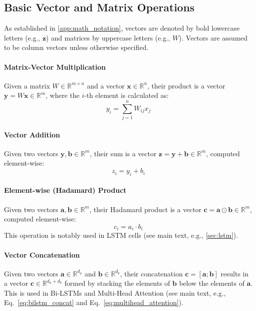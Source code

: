 \begin{appendices}
  \subsection{Basic Vector and Matrix Operations}
  \label{subsec:basic_ops_app}
  As established in \autoref{app:math_notation}, vectors are denoted by bold lowercase letters (e.g., \( \bm{z} \)) and matrices by uppercase letters (e.g., \( W \)). Vectors are assumed to be column vectors unless otherwise specified.

  \paragraph{Matrix-Vector Multiplication}
  Given a matrix \( W \in \mathbb{R}^{m \times n} \) and a vector \( \bm{x} \in \mathbb{R}^n \), their product is a vector \( \bm{y} = W\bm{x} \in \mathbb{R}^m \), where the $i$-th element is calculated as:
  \begin{equation}
    y_i = \sum_{j=1}^{n} W_{ij} x_j
  \end{equation}

  \paragraph{Vector Addition}
  Given two vectors \( \bm{y}, \bm{b} \in \mathbb{R}^m \), their sum is a vector \( \bm{z} = \bm{y} + \bm{b} \in \mathbb{R}^m \), computed element-wise:
  \begin{equation}
    z_i = y_i + b_i
  \end{equation}

  \paragraph{Element-wise (Hadamard) Product}
  Given two vectors \( \bm{a}, \bm{b} \in \mathbb{R}^m \), their Hadamard product is a vector \( \bm{c} = \bm{a} \odot \bm{b} \in \mathbb{R}^m \), computed element-wise:
  \begin{equation}
    c_i = a_i \cdot b_i
  \end{equation}
  This operation is notably used in LSTM cells (see main text, e.g., \autoref{sec:lstm}).

  \paragraph{Vector Concatenation}
  Given two vectors \( \bm{a} \in \mathbb{R}^{d_a} \) and \( \bm{b} \in \mathbb{R}^{d_b} \), their concatenation \( \bm{c} = [\bm{a} ; \bm{b}] \) results in a vector \( \bm{c} \in \mathbb{R}^{d_a + d_b} \) formed by stacking the elements of \( \bm{b} \) below the elements of \( \bm{a} \). This is used in Bi-LSTMs and Multi-Head Attention (see main text, e.g., Eq.~\ref{eq:bilstm_concat} and Eq.~\ref{eq:multihead_attention}).


\end{appendices}
